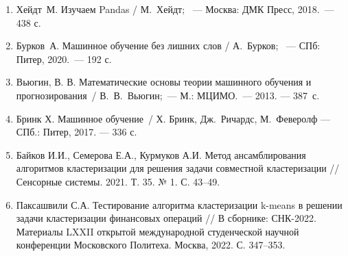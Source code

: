 \documentclass[a4paper,12pt]{article}
\begin{document}
\begin{enumerate}
	\item Хейдт М. Изучаем Pandas / М. Хейдт;  — Москва: ДМК Пресс, 2018. — 438 с.
	\item Бурков А. Машинное обучение без лишних слов / А. Бурков;  — СПб: Питер, 2020. — 192 с.
	\item Вьюгин, В. В. Математические основы теории машинного обучения и прогнозирования / В. В. Вьюгин; — М.: МЦИМО. — 2013. — 387~с.
	\item Бринк Х. Машинное обучение / Х. Бринк, Дж. Ричардс, М. Феверолф  — СПб.: Питер, 2017. — 336 с.
	\item Байков И.И., Семерова Е.А., Курмуков А.И. Метод ансамблирования алгоритмов кластеризации для решения задачи совместной кластеризации // Сенсорные системы. 2021. Т. 35. № 1. С. 43--49.
	\item Паксашвили С.А. Тестирование алгоритма кластеризации k-means в решении задачи кластеризации финансовых операций // В сборнике: СНК-2022. Материалы LXXII открытой международной студенческой научной конференции Московского Политеха. Москва, 2022. С. 347--353.
	
\end{enumerate}
\end{document}
